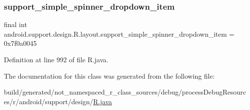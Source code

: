 \subsubsection{\texorpdfstring{support\_simple\_spinner\_dropdown\_item}{support\_simple\_spinner\_dropdown\_item}}
{\footnotesize\ttfamily final int android.\+support.\+design.\+R.\+layout.\+support\+\_\+simple\+\_\+spinner\+\_\+dropdown\+\_\+item = 0x7f0a0045\hspace{0.3cm}{\ttfamily [static]}}



Definition at line 992 of file R.\+java.



The documentation for this class was generated from the following file\+:\begin{DoxyCompactItemize}
\item 
build/generated/not\+\_\+namespaced\+\_\+r\+\_\+class\+\_\+sources/debug/process\+Debug\+Resources/r/android/support/design/\mbox{\hyperlink{android_2support_2design_2_r_8java}{R.\+java}}\end{DoxyCompactItemize}
